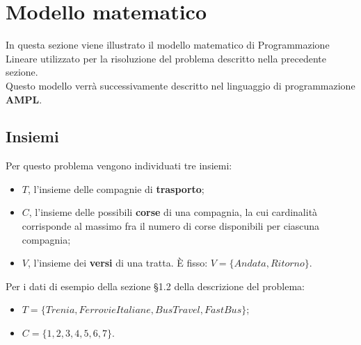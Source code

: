 \documentclass[main.tex]{subfiles}
\begin{document}
\section{Modello matematico}
In questa sezione viene illustrato il modello matematico di Programmazione Lineare utilizzato per la risoluzione del problema descritto nella precedente sezione.\\
Questo modello verrà successivamente descritto nel linguaggio di programmazione \textbf{AMPL}.

\subsection*{Insiemi}
Per questo problema vengono individuati tre insiemi:
\begin{itemize}
    \item $T$, l'insieme delle compagnie di \textbf{trasporto};
    \item $C$, l'insieme delle possibili \textbf{corse} di una compagnia, la cui cardinalità corrisponde al massimo fra il numero di corse disponibili per ciascuna compagnia;
    \item $V$, l'insieme dei \textbf{versi} di una tratta. È fisso: $V = \{Andata, Ritorno\}$.
\end{itemize}
Per i dati di esempio della sezione §1.2 della descrizione del problema:
\begin{itemize}
    \item $T = \{Trenia, FerrovieItaliane, BusTravel, FastBus\}$;
    \item $C = \{1, 2, 3, 4, 5, 6, 7\}$.
\end{itemize}
\end{document}
